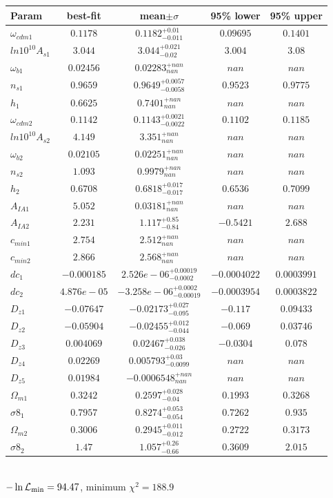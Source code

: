 \begin{tabular}{|l|c|c|c|c|} 
 \hline 
Param & best-fit & mean$\pm\sigma$ & 95\% lower & 95\% upper \\ \hline 
$\omega_{cdm 1 }$ &$0.1178$ & $0.1182_{-0.011}^{+0.01}$ & $0.09695$ & $0.1401$ \\ 
$ln10^{10}A_{s 1 }$ &$3.044$ & $3.044_{-0.02}^{+0.021}$ & $3.004$ & $3.08$ \\ 
$\omega_{b 1 }$ &$0.02456$ & $0.02283_{nan}^{+nan}$ & $nan$ & $nan$ \\ 
$n_{s 1 }$ &$0.9659$ & $0.9649_{-0.0058}^{+0.0057}$ & $0.9523$ & $0.9775$ \\ 
$h_{1 }$ &$0.6625$ & $0.7401_{nan}^{+nan}$ & $nan$ & $nan$ \\ 
$\omega_{cdm 2 }$ &$0.1142$ & $0.1143_{-0.0022}^{+0.0021}$ & $0.1102$ & $0.1185$ \\ 
$ln10^{10}A_{s 2 }$ &$4.149$ & $3.351_{nan}^{+nan}$ & $nan$ & $nan$ \\ 
$\omega_{b 2 }$ &$0.02105$ & $0.02251_{nan}^{+nan}$ & $nan$ & $nan$ \\ 
$n_{s 2 }$ &$1.093$ & $0.9979_{nan}^{+nan}$ & $nan$ & $nan$ \\ 
$h_{2 }$ &$0.6708$ & $0.6818_{-0.017}^{+0.017}$ & $0.6536$ & $0.7099$ \\ 
$A_{IA 1 }$ &$5.052$ & $0.03181_{nan}^{+nan}$ & $nan$ & $nan$ \\ 
$A_{IA 2 }$ &$2.231$ & $1.117_{-0.84}^{+0.85}$ & $-0.5421$ & $2.688$ \\ 
$c_{min 1 }$ &$2.754$ & $2.512_{nan}^{+nan}$ & $nan$ & $nan$ \\ 
$c_{min 2 }$ &$2.866$ & $2.568_{nan}^{+nan}$ & $nan$ & $nan$ \\ 
$dc_{1 }$ &$-0.000185$ & $2.526e-06_{-0.0002}^{+0.00019}$ & $-0.0004022$ & $0.0003991$ \\ 
$dc_{2 }$ &$4.876e-05$ & $-3.258e-06_{-0.00019}^{+0.0002}$ & $-0.0003954$ & $0.0003822$ \\ 
$D_{z1 }$ &$-0.07647$ & $-0.02173_{-0.095}^{+0.027}$ & $-0.117$ & $0.09433$ \\ 
$D_{z2 }$ &$-0.05904$ & $-0.02455_{-0.044}^{+0.012}$ & $-0.069$ & $0.03746$ \\ 
$D_{z3 }$ &$0.004069$ & $0.02467_{-0.026}^{+0.038}$ & $-0.0304$ & $0.078$ \\ 
$D_{z4 }$ &$0.02269$ & $0.005793_{-0.0099}^{+0.03}$ & $nan$ & $nan$ \\ 
$D_{z5 }$ &$0.01984$ & $-0.0006548_{nan}^{+nan}$ & $nan$ & $nan$ \\ 
$\Omega_{m 1 }$ &$0.3242$ & $0.2597_{-0.04}^{+0.028}$ & $0.1993$ & $0.3268$ \\ 
$\sigma8_{1 }$ &$0.7957$ & $0.8274_{-0.054}^{+0.053}$ & $0.7262$ & $0.935$ \\ 
$\Omega_{m 2 }$ &$0.3006$ & $0.2945_{-0.012}^{+0.011}$ & $0.2722$ & $0.3173$ \\ 
$\sigma8_{2 }$ &$1.47$ & $1.057_{-0.66}^{+0.26}$ & $0.3609$ & $2.015$ \\ 
\hline 
 \end{tabular} \\ 
$-\ln{\cal L}_\mathrm{min} =94.47$, minimum $\chi^2=188.9$ \\ 
